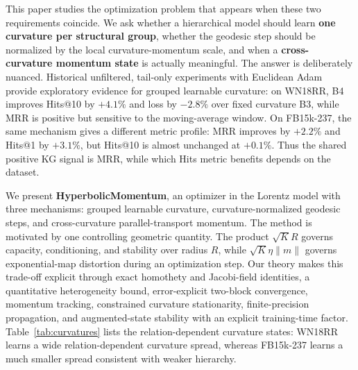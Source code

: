 This paper studies the optimization problem that appears when these two requirements coincide. We ask whether a hierarchical model should learn \textbf{one curvature per structural group}, whether the geodesic step should be normalized by the local curvature-momentum scale, and when a \textbf{cross-curvature momentum state} is actually meaningful. The answer is deliberately nuanced. Historical unfiltered, tail-only experiments with Euclidean Adam provide exploratory evidence for grouped learnable curvature: on WN18RR, B4 improves Hits@10 by $+4.1\%$ and loss by $-2.8\%$ over fixed curvature B3, while MRR is positive but sensitive to the moving-average window. On FB15k-237, the same mechanism gives a different metric profile: MRR improves by $+2.2\%$ and Hits@1 by $+3.1\%$, but Hits@10 is almost unchanged at $+0.1\%$. Thus the shared positive KG signal is MRR, while which Hits metric benefits depends on the dataset.

We present \textbf{HyperbolicMomentum}, an optimizer in the Lorentz model with three mechanisms: grouped learnable curvature, curvature-normalized geodesic steps, and cross-curvature parallel-transport momentum. The method is motivated by one controlling geometric quantity. The product $\sqrt{K}R$ governs capacity, conditioning, and stability over radius $R$, while $\sqrt{K}\eta\|m\|$ governs exponential-map distortion during an optimization step. Our theory makes this trade-off explicit through exact homothety and Jacobi-field identities, a quantitative heterogeneity bound, error-explicit two-block convergence, momentum tracking, constrained curvature stationarity, finite-precision propagation, and augmented-state stability with an explicit training-time factor. Table~\ref{tab:curvatures} lists the relation-dependent curvature states: WN18RR learns a wide relation-dependent curvature spread, whereas FB15k-237 learns a much smaller spread consistent with weaker hierarchy.



